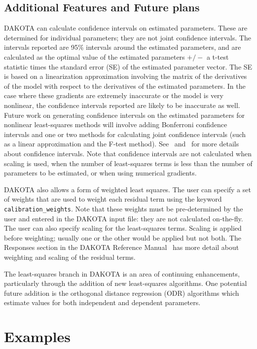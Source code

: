 \subsection{Additional Features and Future plans}\label{nls:solution:future}

DAKOTA can calculate confidence intervals on estimated parameters.
These are determined for individual parameters; they are not joint
confidence intervals.  The intervals reported are 95\% intervals
around the estimated parameters, and are calculated as the optimal
value of the estimated parameters $+/-$ a t-test statistic times the
standard error (SE) of the estimated parameter vector.  The SE is
based on a linearization approximation involving the matrix of the
derivatives of the model with respect to the derivatives of the
estimated parameters.  In the case where these gradients are extremely
inaccurate or the model is very nonlinear, the confidence intervals
reported are likely to be inaccurate as well.  Future work on
generating confidence intervals on the estimated parameters for
nonlinear least-squares methods will involve adding Bonferroni
confidence intervals and one or two methods for calculating joint
confidence intervals (such as a linear approximation and the F-test
method). See~\cite{Seb03} and~\cite{Vug07} for more details about
confidence intervals. Note that confidence intervals are not
calculated when scaling is used, when the number of least-squares
terms is less than the number of parameters to be estimated, or when
using numerical gradients.

DAKOTA also allows a form of weighted least squares.  The user can
specify a set of weights that are used to weight each residual term
using the keyword \texttt{calibration\_weights}.  Note that these
weights must be pre-determined by the user and entered in the DAKOTA
input file: they are not calculated on-the-fly.  The user can also
specify scaling for the least-squares terms.  Scaling is applied
before weighting; usually one or the other would be applied but not
both.  The Responses section in the DAKOTA Reference
Manual~\cite{RefMan} has more detail about weighting and scaling of
the residual terms.

The least-squares branch in DAKOTA is an area of continuing
enhancements, particularly through the addition of new least-squares
algorithms. One potential future addition is the orthogonal distance
regression (ODR) algorithms which estimate values for both independent
and dependent parameters.

\section{Examples}\label{nls:examples}

